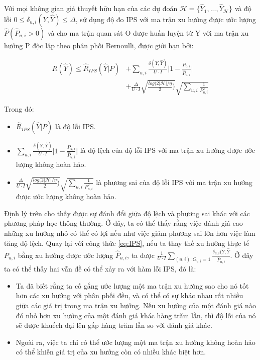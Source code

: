 \begin{theorem}
    Với mọi không gian giả thuyết hữu hạn của các dự đoán $\mathcal{H} = \{\hat{Y}_1,...,\hat{Y}_{\mathcal{H}}\}$ và độ lỗi $0 \leqslant \delta_{u,i}(Y,\hat{Y}) \leqslant \Delta$, sử dụng độ đo IPS với ma trận xu hướng được ước lượng $\hat{P} (\hat{P}_{u,i} > 0)$ và cho ma trận quan sát O được huấn luyện từ Y với ma trận xu hướng P độc lập theo phân phối Bernoulli, được giới hạn bởi:
    
    \begin{equation}
    \begin{aligned}
        \label{eq:bound_erm}
        R(\hat{Y}) \leqslant \hat{R}_{IPS}(\hat{Y}|P) 
        & + \sum_{u,i} \frac{\delta(Y, \hat{Y})}{U \cdot I} \Bigg|1-\frac{P_{u,i}}{\hat{P}_{u,i}}\Bigg| \\ &+ \frac{\Delta}{U \cdot I} \sqrt{\frac{log(2|\mathcal{H}| / \eta}{2})} \sqrt{\sum_{u,i} \frac{1}{P^2_{u,i}}}
    \end{aligned}
    \end{equation}
    
\end{theorem}
Trong đó:
\begin{itemize}
    \item $\hat{R}_{IPS}(\hat{Y}|P)$ là độ lỗi IPS.
    \item $\sum_{u,i} \frac{\delta(Y, \hat{Y})}{U \cdot I} \Bigg|1-\frac{P_{u,i}}{\hat{P}_{u,i}}\Bigg|$ là độ lệch của độ lỗi IPS với ma trận xu hướng được ước lượng không hoàn hảo.
    \item $\frac{\Delta}{U \cdot I} \sqrt{\frac{log(2|\mathcal{H}| / \eta}{2})} \sqrt{\sum_{u,i} \frac{1}{P^2_{u,i}}}$ là phương sai của độ lỗi IPS với ma trận xu hướng được ước lượng không hoàn hảo.
\end{itemize}
Định lý trên cho thấy được sự đánh đổi giữa độ lệch và phương sai khác với các phương pháp học thông thường. Ở đây, ta có thể thấy rằng việc đánh giá cao những xu hướng nhỏ có thể có lợi nếu như việc giảm phương sai lớn hơn việc làm tăng độ lệch. Quay lại với công thức \ref{eq:IPS}, nếu ta thay thế xu hướng thực tế $P_{u,i}$ bằng xu hướng được ước lượng $\hat{P}_{u,i}$, ta được  $ \frac{1}{U \cdot I} \sum_{(u,i): O_{u,i} = 1} \frac{\delta_{u,i}(Y, \hat{Y}}{\hat{P}_{u,i}}$. Ở đây ta có thể thấy hai vẫn đề có thể xảy ra với hàm lỗi IPS, đó là:
\begin{itemize}
    \item Ta đã biết rằng ta cố gắng ước lượng một ma trận xu hướng sao cho nó tốt hơn các xu hướng với phân phối đều, và có thể có sự khác nhau rất nhiều giữa các giá trị trong ma trận xu hướng. Nếu xu hướng của một đánh giá nào đó nhỏ hơn xu hướng của một đánh giá khác hàng trăm lần, thì độ lỗi của nó sẽ được khuếch đại lên gấp hàng trăm lần so với đánh giá khác.
    \item Ngoài ra, việc ta chỉ có thể ước lượng một ma trận xu hướng không hoàn hảo có thể khiến giá trị của xu hướng còn có nhiều khác biệt hơn.
\end{itemize}

